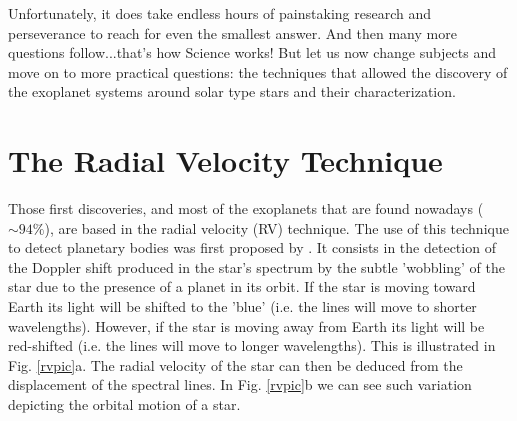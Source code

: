 \documentclass[dvips,12pt,a4paper]{report}
\begin{document}
Unfortunately, it does take endless hours of painstaking research and perseverance to reach for even the smallest answer. And then many more questions follow...that's how Science works! But let us now change subjects and move on to more practical questions: the techniques that allowed the discovery of the exoplanet systems around solar type stars and their characterization.


\section{The Radial Velocity Technique}

Those first discoveries, and most of the exoplanets that are found nowadays ($\sim 94\%$), are based in the radial velocity (RV) technique. The use of this technique to detect planetary bodies was first proposed by \citet{Struve-1952}. It consists in the detection of the Doppler shift produced in the star's spectrum  by the subtle 'wobbling' of the star due to the presence of a planet in its orbit. If the star is moving toward Earth its light will be shifted to the 'blue' (i.e. the lines will move to shorter wavelengths). However, if the star is moving away from Earth its light will be red-shifted (i.e. the lines will move to longer wavelengths). This is illustrated in Fig. \ref{rvpic}a. The radial velocity of the star can then be deduced from the displacement of the spectral lines. In Fig. \ref{rvpic}b we can see such variation depicting the orbital motion of a star. 
\end{document}
